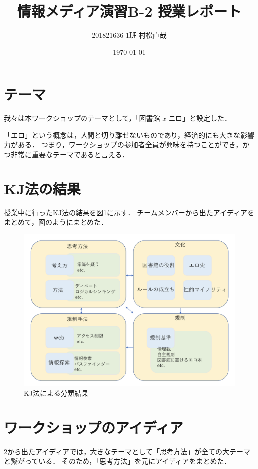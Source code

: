 \documentclass[uplatex,a4paper]{jsarticle}
\title{情報メディア演習B-2 授業レポート}
\author{201821636 1班 村松直哉}
\date{\today}
\begin{document}
\maketitle
%
%
\section{テーマ}
我々は本ワークショップのテーマとして，「図書館 $x$ エロ」と設定した．

「エロ」という概念は，人間と切り離せないものであり，経済的にも大きな影響力がある．
つまり，ワークショップの参加者全員が興味を持つことができ，かつ非常に重要なテーマであると言える．


\section{KJ法の結果} \label{sec:kj}
授業中に行ったKJ法の結果を図\ref{fig:result}に示す．
チームメンバーから出たアイディアをまとめて，図のようにまとめた．

\begin{figure}[htb]
\begin{center}
    \includegraphics[width=14cm]{figs/result.png}
\end{center}
\caption{KJ法による分類結果}
\label{fig:result}
\end{figure}


\section{ワークショップのアイディア}
\ref{sec:kj}から出たアイディアでは，大きなテーマとして「思考方法」が全ての大テーマと繋がっている．
そのため，「思考方法」を元にアイディアをまとめた．
\end{document}
